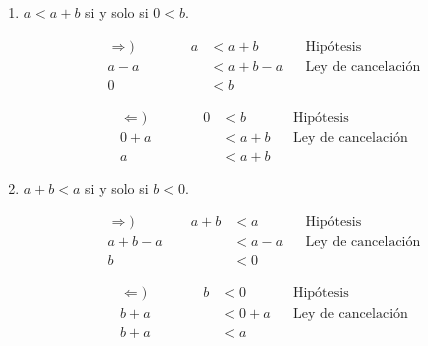 \begin{enumerate}[label=\alph*)]
\begin{enumerate}[label=\roman*)]
  \item $a<a+b$ si y solo si $0<b$.
  \begin{center}\vspace{-1em}
  \begin{minipage}[l]{.5\linewidth}
   \begin{align*}
    \Rightarrow) \qquad \qquad
    a &< a + b && \text{Hipótesis}\\
    a -a &< a + b - a && \text{Ley de cancelación}\\
    0 &< b%
   \end{align*}
  \end{minipage}%
  \begin{minipage}[r]{.5\linewidth}
   \begin{align*}
    \Leftarrow) \qquad \qquad
    0 &< b && \text{Hipótesis}\\
    0 + a &< a + b && \text{Ley de cancelación}\\
    a &< a + b%
   \end{align*}
  \end{minipage}
  \end{center}
  
  \item $a+b<a$ si y solo si $b<0$.
  \begin{center}\vspace{-1em}
  \begin{minipage}[l]{.5\linewidth}
   \begin{align*} \Rightarrow) \qquad \qquad
    a+b &< a && \text{Hipótesis}\\
    a+b-a &< a-a && \text{Ley de cancelación}\\
    b &< 0%
   \end{align*}
  \end{minipage}%
  \begin{minipage}[r]{.5\linewidth}
   \begin{align*} \Leftarrow) \qquad \qquad
    b &< 0 && \text{Hipótesis}\\
    b + a &< 0 + a && \text{Ley de cancelación}\\
    b+ a &< a%
   \end{align*}
  \end{minipage}
  \end{center}
  

\end{enumerate}
\end{enumerate}
